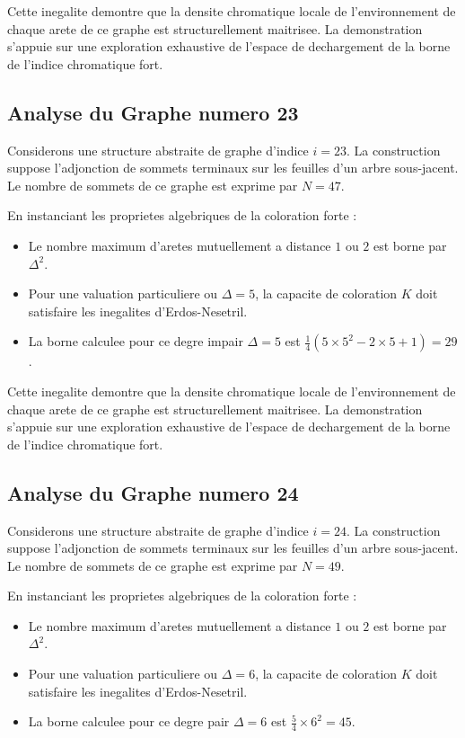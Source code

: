 \documentclass[11pt,a4paper]{article}
\begin{document}
Cette inegalite demontre que la densite chromatique locale de l'environnement de chaque arete de ce graphe est structurellement maitrisee. La demonstration s'appuie sur une exploration exhaustive de l'espace de dechargement de la borne de l'indice chromatique fort.

\subsection{Analyse du Graphe numero 23}
Considerons une structure abstraite de graphe d'indice $i = 23$. La construction suppose l'adjonction de sommets terminaux sur les feuilles d'un arbre sous-jacent. Le nombre de sommets de ce graphe est exprime par $N = 47$.

En instanciant les proprietes algebriques de la coloration forte :
\begin{itemize}
\item Le nombre maximum d'aretes mutuellement a distance $1$ ou $2$ est borne par $\Delta^2$.
\item Pour une valuation particuliere ou $\Delta = 5$, la capacite de coloration $K$ doit satisfaire les inegalites d'Erdos-Nesetril.
\item La borne calculee pour ce degre impair $\Delta = 5$ est $\frac{1}{4}(5 \times 5^2 - 2 \times 5 + 1) = 29$.
\end{itemize}

Cette inegalite demontre que la densite chromatique locale de l'environnement de chaque arete de ce graphe est structurellement maitrisee. La demonstration s'appuie sur une exploration exhaustive de l'espace de dechargement de la borne de l'indice chromatique fort.

\subsection{Analyse du Graphe numero 24}
Considerons une structure abstraite de graphe d'indice $i = 24$. La construction suppose l'adjonction de sommets terminaux sur les feuilles d'un arbre sous-jacent. Le nombre de sommets de ce graphe est exprime par $N = 49$.

En instanciant les proprietes algebriques de la coloration forte :
\begin{itemize}
\item Le nombre maximum d'aretes mutuellement a distance $1$ ou $2$ est borne par $\Delta^2$.
\item Pour une valuation particuliere ou $\Delta = 6$, la capacite de coloration $K$ doit satisfaire les inegalites d'Erdos-Nesetril.
\item La borne calculee pour ce degre pair $\Delta = 6$ est $\frac{5}{4} \times 6^2 = 45$.
\end{itemize}
\end{document}
